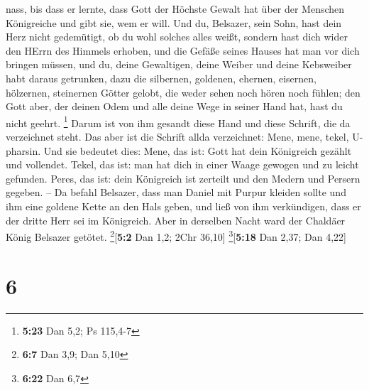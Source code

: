 nass, bis dass er lernte, dass Gott der Höchste Gewalt hat über der
Menschen Königreiche und gibt sie, wem er will.  Und du,
Belsazer, sein Sohn, hast dein Herz nicht gedemütigt, ob du wohl solches
alles weißt,  sondern hast dich wider den HErrn des
Himmels erhoben, und die Gefäße seines Hauses hat man vor dich bringen
müssen, und du, deine Gewaltigen, deine Weiber und deine Kebsweiber habt
daraus getrunken, dazu die silbernen, goldenen, ehernen, eisernen,
hölzernen, steinernen Götter gelobt, die weder sehen noch hören noch
fühlen; den Gott aber, der deinen Odem und alle deine Wege in seiner
Hand hat, hast du nicht geehrt. \footnote{\textbf{5:23} Dan 5,2; Ps
  115,4-7}  Darum ist von ihm gesandt diese Hand und
diese Schrift, die da verzeichnet steht.  Das aber ist
die Schrift allda verzeichnet: Mene, mene, tekel, U-pharsin.
 Und sie bedeutet dies: Mene, das ist: Gott hat dein
Königreich gezählt und vollendet.  Tekel, das ist: man
hat dich in einer Waage gewogen und zu leicht gefunden. 
Peres, das ist: dein Königreich ist zerteilt und den Medern und Persern
gegeben. --  Da befahl Belsazer, dass man Daniel mit
Purpur kleiden sollte und ihm eine goldene Kette an den Hals geben, und
ließ von ihm verkündigen, dass er der dritte Herr sei im Königreich.
 Aber in derselben Nacht ward der Chaldäer König Belsazer
getötet. \footnote{\textbf{6:7} Dan 3,9; Dan 5,10}{[}\textbf{5:2} Dan
1,2; 2Chr 36,10{]} \footnote{\textbf{6:22} Dan 6,7}{[}\textbf{5:18} Dan
2,37; Dan 4,22{]}

\hypertarget{section-5}{%
\section{6}\label{section-5}}

